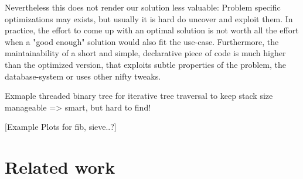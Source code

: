 Nevertheless this does not render our solution less valuable: Problem specific optimizations may exists, but usually it is hard do uncover and exploit them. In practice, the effort to come up with an optimal solution is not worth all the effort when a "good enough" solution would also fit the use-case. Furthermore, the maintainability of a short and simple, declarative piece of code is much higher than the optimized version, that exploits subtle properties of the problem, the database-system or uses other nifty tweaks.

Exmaple threaded binary tree for iterative tree traversal to keep stack size manageable => smart, but hard to find!

[Example Plots for fib, sieve..?]

\section{Related work}\label{related_work}